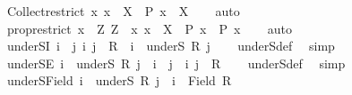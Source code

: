 \begin{isabellebody}
\ Collect{\isacharunderscore}{\kern0pt}restrict{\isacharcolon}{\kern0pt}\ {\isachardoublequoteopen}{\isacharbraceleft}{\kern0pt}x{\isachardot}{\kern0pt}\ x\ {\isasymin}\ X\ {\isasymand}\ P\ x{\isacharbraceright}{\kern0pt}\ {\isasymsubseteq}\ X{\isachardoublequoteclose}\isanewline
%
\isadelimproof
\ \ %
\endisadelimproof
%
\isatagproof
{}\isamarkupfalse%
\ auto%
\endisatagproof
{\isafoldproof}%
%
\isadelimproof
\isanewline
%
\endisadelimproof
\isanewline
{}\isamarkupfalse%
\ prop{\isacharunderscore}{\kern0pt}restrict{\isacharcolon}{\kern0pt}\ {\isachardoublequoteopen}{\isasymlbrakk}x\ {\isasymin}\ Z{\isacharsemicolon}{\kern0pt}\ Z\ {\isasymsubseteq}\ {\isacharbraceleft}{\kern0pt}x{\isachardot}{\kern0pt}\ x\ {\isasymin}\ X\ {\isasymand}\ P\ x{\isacharbraceright}{\kern0pt}{\isasymrbrakk}\ {\isasymLongrightarrow}\ P\ x{\isachardoublequoteclose}\isanewline
%
\isadelimproof
\ \ %
\endisadelimproof
%
\isatagproof
{}\isamarkupfalse%
\ auto%
\endisatagproof
{\isafoldproof}%
%
\isadelimproof
\isanewline
%
\endisadelimproof
\isanewline
{}\isamarkupfalse%
\ underS{\isacharunderscore}{\kern0pt}I{\isacharcolon}{\kern0pt}\ {\isachardoublequoteopen}{\isasymlbrakk}i\ {\isasymnoteq}\ j{\isacharsemicolon}{\kern0pt}\ {\isacharparenleft}{\kern0pt}i{\isacharcomma}{\kern0pt}\ j{\isacharparenright}{\kern0pt}\ {\isasymin}\ R{\isasymrbrakk}\ {\isasymLongrightarrow}\ i\ {\isasymin}\ underS\ R\ j{\isachardoublequoteclose}\isanewline
%
\isadelimproof
\ \ %
\endisadelimproof
%
\isatagproof
{}\isamarkupfalse%
\ underS{\isacharunderscore}{\kern0pt}def\ \isamarkupfalse%
\ simp%
\endisatagproof
{\isafoldproof}%
%
\isadelimproof
\isanewline
%
\endisadelimproof
\isanewline
{}\isamarkupfalse%
\ underS{\isacharunderscore}{\kern0pt}E{\isacharcolon}{\kern0pt}\ {\isachardoublequoteopen}i\ {\isasymin}\ underS\ R\ j\ {\isasymLongrightarrow}\ i\ {\isasymnoteq}\ j\ {\isasymand}\ {\isacharparenleft}{\kern0pt}i{\isacharcomma}{\kern0pt}\ j{\isacharparenright}{\kern0pt}\ {\isasymin}\ R{\isachardoublequoteclose}\isanewline
%
\isadelimproof
\ \ %
\endisadelimproof
%
\isatagproof
{}\isamarkupfalse%
\ underS{\isacharunderscore}{\kern0pt}def\ \isamarkupfalse%
\ simp%
\endisatagproof
{\isafoldproof}%
%
\isadelimproof
\isanewline
%
\endisadelimproof
\isanewline
{}\isamarkupfalse%
\ underS{\isacharunderscore}{\kern0pt}Field{\isacharcolon}{\kern0pt}\ {\isachardoublequoteopen}i\ {\isasymin}\ underS\ R\ j\ {\isasymLongrightarrow}\ i\ {\isasymin}\ Field\ R{\isachardoublequoteclose}\isanewline

\end{isabellebody}
